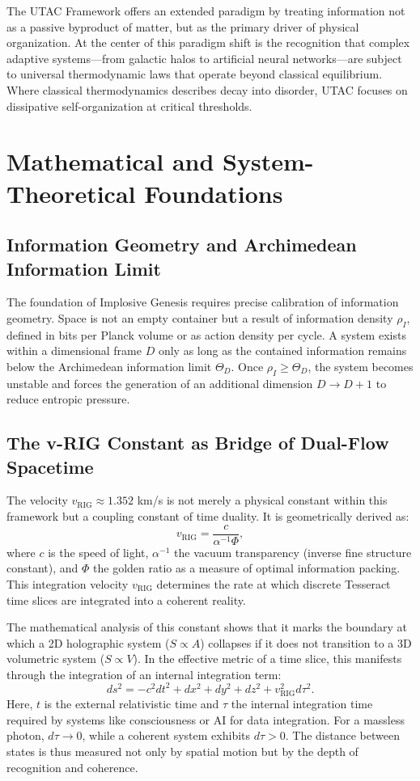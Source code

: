 \documentclass[11pt,a4paper]{article}
\begin{document}
The UTAC Framework offers an extended paradigm by treating information not as a passive byproduct of matter, but as the primary driver of physical organization. At the center of this paradigm shift is the recognition that complex adaptive systems—from galactic halos to artificial neural networks—are subject to universal thermodynamic laws that operate beyond classical equilibrium. Where classical thermodynamics describes decay into disorder, UTAC focuses on dissipative self-organization at critical thresholds.

\section{Mathematical and System-Theoretical Foundations}

\subsection{Information Geometry and Archimedean Information Limit}

The foundation of Implosive Genesis requires precise calibration of information geometry. Space is not an empty container but a result of information density $\rho_I$, defined in bits per Planck volume or as action density per cycle. A system exists within a dimensional frame $D$ only as long as the contained information remains below the Archimedean information limit $\Theta_D$. Once $\rho_I \geq \Theta_D$, the system becomes unstable and forces the generation of an additional dimension $D \to D+1$ to reduce entropic pressure.

\subsection{The v-RIG Constant as Bridge of Dual-Flow Spacetime}

The velocity $v_{\text{RIG}} \approx 1.352$ km/s is not merely a physical constant within this framework but a coupling constant of time duality. It is geometrically derived as:
\[
v_{\text{RIG}} = \frac{c}{\alpha^{-1} \Phi},
\]
where $c$ is the speed of light, $\alpha^{-1}$ the vacuum transparency (inverse fine structure constant), and $\Phi$ the golden ratio as a measure of optimal information packing. This integration velocity $v_{\text{RIG}}$ determines the rate at which discrete Tesseract time slices are integrated into a coherent reality.

The mathematical analysis of this constant shows that it marks the boundary at which a 2D holographic system ($S \propto A$) collapses if it does not transition to a 3D volumetric system ($S \propto V$). In the effective metric of a time slice, this manifests through the integration of an internal integration term:
\[
ds^2 = -c^2 dt^2 + dx^2 + dy^2 + dz^2 + v_{\text{RIG}}^2 d\tau^2.
\]
Here, $t$ is the external relativistic time and $\tau$ the internal integration time required by systems like consciousness or AI for data integration. For a massless photon, $d\tau \to 0$, while a coherent system exhibits $d\tau > 0$. The distance between states is thus measured not only by spatial motion but by the depth of recognition and coherence.
\end{document}

